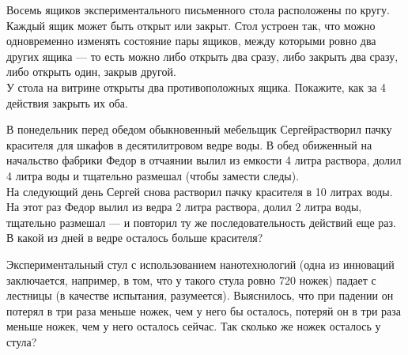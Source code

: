 ﻿
\begin{enumerate}

\itA Восемь ящиков экспериментального письменного стола расположены по кругу. Каждый ящик может быть открыт или закрыт. Стол устроен так, что можно одновременно изменять состояние пары ящиков, между которыми ровно два других ящика — то есть можно либо открыть два сразу, либо закрыть два сразу, либо открыть один, закрыв другой. \smallskip \\
У стола на витрине открыты два противоположных ящика. Покажите, как за 4 действия закрыть их оба.

\itB В понедельник перед обедом обыкновенный мебельщик Сергей\linebreak растворил пачку красителя для шкафов в десятилитровом ведре воды. В обед обиженный на начальство фабрики Федор в отчаянии вылил из емкости 4 литра раствора, долил 4 литра воды и тщательно размешал (чтобы замести следы). \smallskip \\
На следующий день Сергей снова растворил пачку красителя в 10 литрах воды. На этот раз Федор вылил из ведра 2 литра раствора, долил 2 литра воды, тщательно размешал — и повторил ту же последовательность действий еще раз. В какой из дней в ведре осталось больше красителя?

\itC Экспериментальный стул с использованием нанотехнологий (одна из инноваций заключается, например, в том, что у такого стула ровно 720 ножек) падает с лестницы (в качестве испытания, разумеется). Выяснилось, что при падении он потерял в три раза меньше ножек, чем у него бы осталось, потеряй он в три раза меньше ножек, чем у него осталось сейчас. Так сколько же ножек осталось у стула?
\end{enumerate}